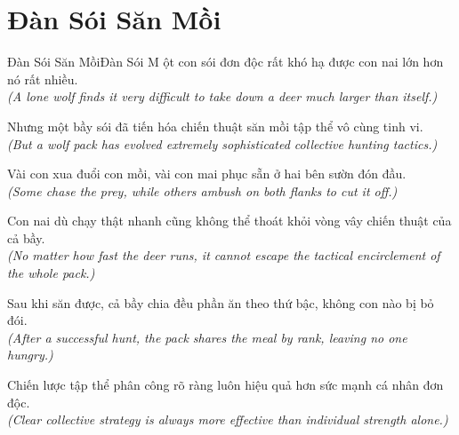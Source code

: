 \section{Đàn Sói Săn Mồi}
\begin{truyen}{Đàn Sói Săn Mồi}{Đàn Sói}
M ột con sói đơn độc rất khó hạ được con nai lớn hơn nó rất nhiều.\\
\textit{(A lone wolf finds it very difficult to take down a deer much larger than itself.)}

Nhưng một bầy sói đã tiến hóa chiến thuật săn mồi tập thể vô cùng tinh vi.\\
\textit{(But a wolf pack has evolved extremely sophisticated collective hunting tactics.)}

Vài con xua đuổi con mồi, vài con mai phục sẵn ở hai bên sườn đón đầu.\\
\textit{(Some chase the prey, while others ambush on both flanks to cut it off.)}

Con nai dù chạy thật nhanh cũng không thể thoát khỏi vòng vây chiến thuật của cả bầy.\\
\textit{(No matter how fast the deer runs, it cannot escape the tactical encirclement of the whole pack.)}

Sau khi săn được, cả bầy chia đều phần ăn theo thứ bậc, không con nào bị bỏ đói.\\
\textit{(After a successful hunt, the pack shares the meal by rank, leaving no one hungry.)}

\end{truyen}
\begin{baihoc}
  Chiến lược tập thể phân công rõ ràng luôn hiệu quả hơn sức mạnh cá nhân đơn độc.\\
  \textit{(Clear collective strategy is always more effective than individual strength alone.)}
\end{baihoc}

